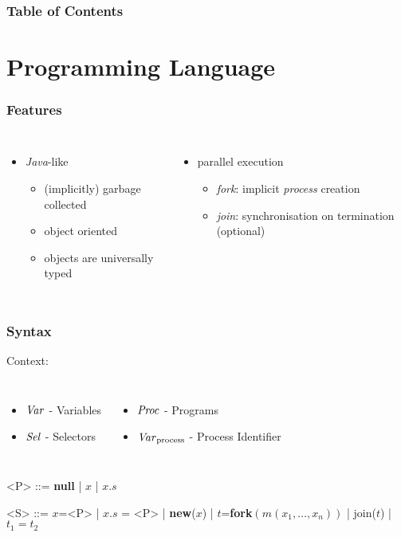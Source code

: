 \documentclass{beamer}
\begin{document}
\begin{frame}
	\frametitle{Table of Contents}
	\tableofcontents
\end{frame}

\section{Programming Language}


\begin{frame}
	\frametitle{Features}
	\begin{columns}
		\begin{itemize}
			\item \emph{Java}-like
				\begin{itemize}
					\item (implicitly) garbage collected
					\item object oriented
					\item objects are universally typed
				\end{itemize}
		\end{itemize}
		\begin{itemize}
			\item parallel execution
				\begin{itemize}
					\item \emph{fork}: implicit \emph{process} creation
					\item \emph{join}: synchronisation on termination (optional)
				\end{itemize}
		\end{itemize}
	\end{columns}
\end{frame}

\begin{frame}[fragile]
	\frametitle{Syntax}
	Context:
	\begin{columns}
		\column{0.5\textwidth}
			\begin{itemize}
				\item $\mathit{Var}$ - Variables
				\item $\mathit{Sel}$ - Selectors
			\end{itemize}
		\column{0.5\textwidth}
			\begin{itemize}
				\item $\mathit{Proc}$ - Programs
				\item $\mathit{Var}_{\text{process}}$ - Process Identifier
			\end{itemize}
	\end{columns}
	\setlength{\grammarindent}{2cm}
	\begin{grammar}
	<P> ::= \textbf{null} | $x$ | $x.s$

	<S> ::= $x$=<P> | $x.s$ = <P> | \textbf{new}($x$) |
	$t$=\textbf{fork}$(m(x_1,\dots,x_n))$ | join($t$) | $t_1 = t_2$
	\end{grammar}
\end{frame}
\end{document}
